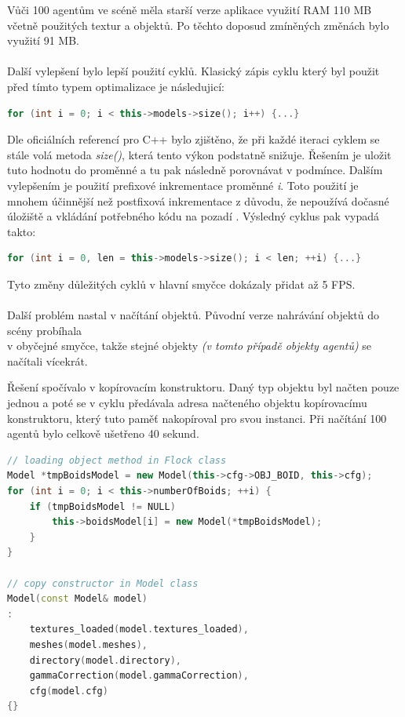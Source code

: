 \documentclass[czech,public,dept460,male,cpdeclaration]{diploma}
\begin{document}
Vůči 100 agentům ve scéně měla starší verze aplikace využití RAM 110 MB včetně použitých textur a objektů. Po těchto doposud zmíněných změnách bylo využití 91 MB.
\\\\
Další vylepšení bylo lepší použití cyklů. Klasický zápis cyklu který byl použit před tímto typem optimalizace je následujicí:
\begin{lstlisting}[language=c++,label=src:classic cycle,caption=Použití klasického cyklu] 
for (int i = 0; i < this->models->size(); i++) {...}
\end{lstlisting}
Dle oficiálních referencí pro C++ \cite{linkToCppReference} bylo zjištěno, že při každé iteraci cyklem se stále volá metoda \textit{size()}, která tento výkon podstatně snižuje. Řešením je uložit tuto hodnotu do proměnné a tu pak  následně porovnávat v podmínce. Dalším vylepšením je použití prefixové inkrementace proměnné \textit{i}. Toto použití je mnohem účinnější než postfixová inkrementace z důvodu, že nepoužívá dočasné úložiště a vkládání potřebného kódu na pozadí \cite{linkToPreIncrementation}. Výsledný cyklus pak vypadá takto:
\begin{lstlisting}[language=c++,label=src:optimalized cycle,caption=Použití optimalizovaného cyklu] 
for (int i = 0, len = this->models->size(); i < len; ++i) {...}
\end{lstlisting}

Tyto změny důležitých cyklů v hlavní smyčce dokázaly přidat až 5 FPS.
\\\\
Další problém nastal v načítání objektů. Původní verze nahrávání objektů do scény probíhala\\ v obyčejné smyčce, takže stejné objekty \textit{(v tomto případě objekty agentů)} se načítali vícekrát. 

Řešení spočívalo v kopírovacím konstruktoru. Daný typ objektu byl načten pouze jednou a poté se v cyklu předávala adresa načteného objektu kopírovacímu konstruktoru, který tuto paměť nakopíroval pro svou instanci. Při načítání 100 agentů bylo celkově ušetřeno 40 sekund.

\begin{lstlisting}[language=c++,label=src:copy constructor,caption=Ukázka použití kopírovacího konstruktoru]
// loading object method in Flock class
Model *tmpBoidsModel = new Model(this->cfg->OBJ_BOID, this->cfg);
for (int i = 0; i < this->numberOfBoids; ++i) {
	if (tmpBoidsModel != NULL)
		this->boidsModel[i] = new Model(*tmpBoidsModel);
	}
}

// copy constructor in Model class
Model(const Model& model) 
: 
	textures_loaded(model.textures_loaded),
	meshes(model.meshes),
	directory(model.directory),
	gammaCorrection(model.gammaCorrection),
	cfg(model.cfg)
{}
\end{lstlisting}
\end{document}
